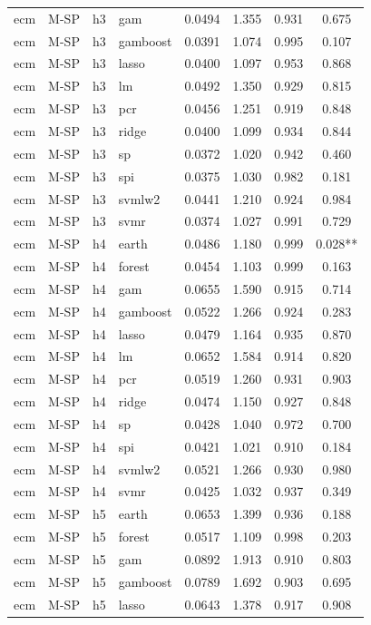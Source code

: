 \begin{ThreePartTable}
\begin{longtable}[t]{llclcccc}
ecm & M-SP & h3 & gam & 0.0494 & 1.355 & 0.931 & 0.675\\
ecm & M-SP & h3 & gamboost & 0.0391 & 1.074 & 0.995 & 0.107\\
ecm & M-SP & h3 & lasso & 0.0400 & 1.097 & 0.953 & 0.868\\
ecm & M-SP & h3 & lm & 0.0492 & 1.350 & 0.929 & 0.815\\
ecm & M-SP & h3 & pcr & 0.0456 & 1.251 & 0.919 & 0.848\\
ecm & M-SP & h3 & ridge & 0.0400 & 1.099 & 0.934 & 0.844\\
ecm & M-SP & h3 & sp & 0.0372 & 1.020 & 0.942 & 0.460\\
ecm & M-SP & h3 & spi & 0.0375 & 1.030 & 0.982 & 0.181\\
ecm & M-SP & h3 & svmlw2 & 0.0441 & 1.210 & 0.924 & 0.984\\
ecm & M-SP & h3 & svmr & 0.0374 & 1.027 & 0.991 & 0.729\\
\addlinespace
ecm & M-SP & h4 & earth & 0.0486 & 1.180 & 0.999 & 0.028**\\
ecm & M-SP & h4 & forest & 0.0454 & 1.103 & 0.999 & 0.163\\
ecm & M-SP & h4 & gam & 0.0655 & 1.590 & 0.915 & 0.714\\
ecm & M-SP & h4 & gamboost & 0.0522 & 1.266 & 0.924 & 0.283\\
ecm & M-SP & h4 & lasso & 0.0479 & 1.164 & 0.935 & 0.870\\
ecm & M-SP & h4 & lm & 0.0652 & 1.584 & 0.914 & 0.820\\
ecm & M-SP & h4 & pcr & 0.0519 & 1.260 & 0.931 & 0.903\\
ecm & M-SP & h4 & ridge & 0.0474 & 1.150 & 0.927 & 0.848\\
ecm & M-SP & h4 & sp & 0.0428 & 1.040 & 0.972 & 0.700\\
ecm & M-SP & h4 & spi & 0.0421 & 1.021 & 0.910 & 0.184\\
ecm & M-SP & h4 & svmlw2 & 0.0521 & 1.266 & 0.930 & 0.980\\
ecm & M-SP & h4 & svmr & 0.0425 & 1.032 & 0.937 & 0.349\\
\addlinespace
ecm & M-SP & h5 & earth & 0.0653 & 1.399 & 0.936 & 0.188\\
ecm & M-SP & h5 & forest & 0.0517 & 1.109 & 0.998 & 0.203\\
ecm & M-SP & h5 & gam & 0.0892 & 1.913 & 0.910 & 0.803\\
ecm & M-SP & h5 & gamboost & 0.0789 & 1.692 & 0.903 & 0.695\\
ecm & M-SP & h5 & lasso & 0.0643 & 1.378 & 0.917 & 0.908\\

\end{longtable}
\end{ThreePartTable}
